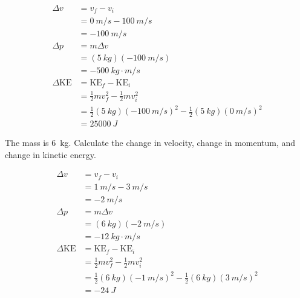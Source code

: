 \documentclass[]{exam}
\begin{document}
\begin{questions}
\begin{solution}
\begin{align*}
    \Delta v &= v_f - v_i \\[1ex]
    &= \SI{0}{m/s} - \SI{100}{m/s} \\[1ex]
    &= \boxed{\SI{-100}{m/s}} \\[2ex]
    \Delta p &= m \Delta v \\[1ex]
    &= (\SI{5}{kg})(\SI{-100}{m/s}) \\[1ex]
    &= \boxed{\SI{-500}{kg\cdot m/s}} \\[2ex]
    \Delta \mathrm{KE} &= \mathrm{KE}_f - \mathrm{KE}_i \\[1ex]
    &= \frac{1}{2}m v_f^2 - \frac{1}{2}mv_i^2 \\[1ex]
    &= \frac{1}{2}(\SI{5}{kg})(\SI{-100}{m/s})^2 - \frac{1}{2}(\SI{5}{kg}) (\SI{0}{m/s})^2 \\[1ex]
    &= \boxed{\SI{25000}{J}}
\end{align*}
\end{solution}

\ifprintanswers
    \clearpage
\fi

\question
The mass is \SI{6}{kg}. Calculate the change in velocity, change in momentum, and change in kinetic energy. 

\begin{center}
\end{center}

\begin{solution}
\begin{align*}
    \Delta v &= v_f - v_i \\[1ex]
    &= \SI{1}{m/s} - \SI{3}{m/s} \\[1ex]
    &= \boxed{\SI{-2}{m/s}} \\[2ex]
    \Delta p &= m \Delta v \\[1ex]
    &= (\SI{6}{kg})(\SI{-2}{m/s}) \\[1ex]
    &= \boxed{\SI{-12}{kg\cdot m/s}} \\[2ex]
    \Delta \mathrm{KE} &= \mathrm{KE}_f - \mathrm{KE}_i \\[1ex]
    &= \frac{1}{2}m v_f^2 - \frac{1}{2}mv_i^2 \\[1ex]
    &= \frac{1}{2}(\SI{6}{kg})(\SI{-1}{m/s})^2 - \frac{1}{2}(\SI{6}{kg}) (\SI{3}{m/s})^2 \\[1ex]
    &= \boxed{\SI{-24}{J}}
\end{align*}
\end{solution}


\end{questions}
\end{document}
